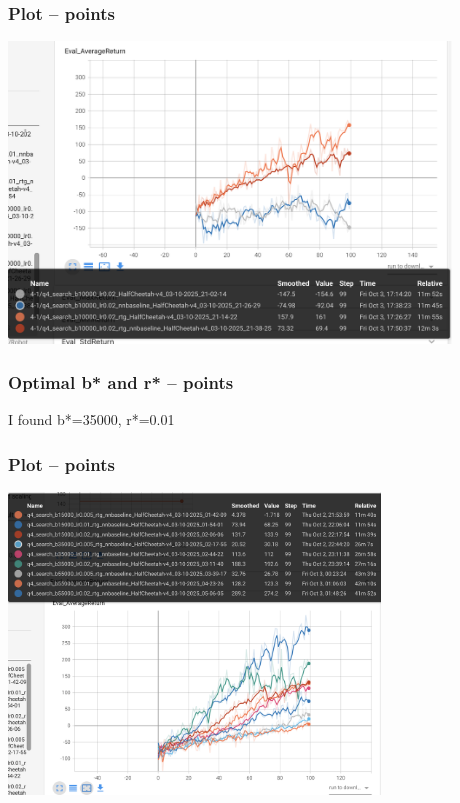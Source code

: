 \documentclass{article}
\begin{document}
\subsubsection{Plot --  points\rbrack}
\begin{answer}[title=Q7.2.2,height=10cm,width=\linewidth]
\centering
\includegraphics[height=8cm]{q4_1.png}
\end{answer}

\subsubsection{ Optimal b* and r* --  points\rbrack}
\begin{answer}[title=Q7.2.3,height=4cm,width=\linewidth]
I found b*=35000, r*=0.01
\end{answer}

\subsubsection{ Plot --  points\rbrack}
\begin{answer}[title=Q7.2.4,height=10cm,width=\linewidth]
\centering
\includegraphics[height=8cm]{q4_2.png}
\end{answer}
\end{document}
